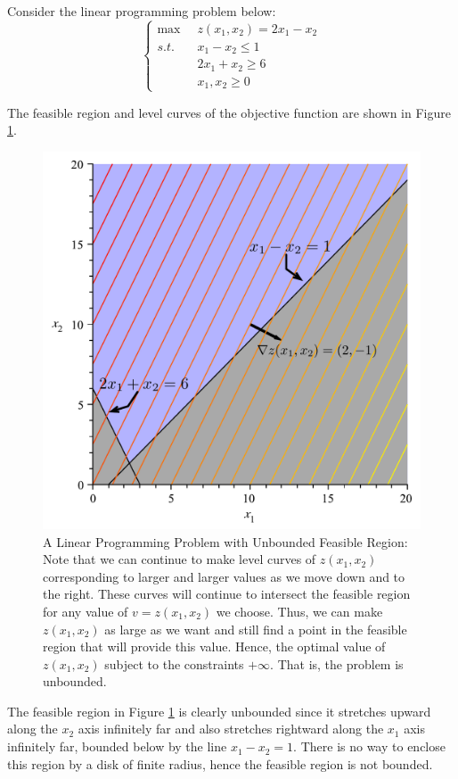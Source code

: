 \begin{example}{}{} Consider the linear programming problem below:
\begin{equation}
\left\{
\begin{aligned}
\max\;\;& z(x_1,x_2) = 2x_1 - x_2\\
s.t.\;\;& x_1 - x_2 \leq 1\\
& 2x_1 + x_2 \geq 6\\
&x_1,x_2 \geq 0
\end{aligned}
\right.
\label{eqn:LPUnboundFeasibleRegion1}
\end{equation}
\end{example}
\begin{solution}
The feasible region and level curves of the objective function are shown in Figure \ref{fig:LPUnboundFeasibleRegion1}. 
\begin{figure}[H]%
\centering
\includegraphics[scale=0.4]{UnboundedFeasibleRegion.pdf}
\caption{A Linear Programming Problem with Unbounded Feasible Region: Note that we can continue to make level curves of $z(x_1,x_2)$ corresponding to larger and larger values as we move down and to the right. These curves will continue to intersect the feasible region for any value of $v = z(x_1,x_2)$ we choose. Thus, we can make $z(x_1,x_2)$ as large as we want and still find a point in the feasible region that will provide this value. Hence, the optimal value of $z(x_1,x_2)$ subject to the constraints $+\infty$. That is, the problem is unbounded.}
\label{fig:LPUnboundFeasibleRegion1}
\end{figure}
The feasible region in Figure \ref{fig:LPUnboundFeasibleRegion1} is clearly unbounded since it stretches upward along the $x_2$ axis infinitely far and also stretches rightward along the $x_1$ axis infinitely far, bounded below by the line $x_1-x_2 = 1$. There is no way to enclose this region by a disk of finite radius, hence the feasible region is not bounded. 


\end{solution}
